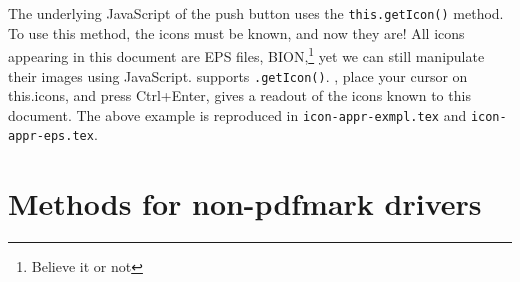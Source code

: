 \documentclass{article}
\begin{document}
\begin{center} %
{}\vcgBdry[6bp]
\olBdry
{}
\end{center}

\noindent
The underlying JavaScript of the push button uses the \texttt{this.getIcon()} method.
To use this method, the icons must be known, and now they are! All icons appearing in this document
are EPS files, BION,\footnote{Believe it or not} yet we can still manipulate their images using JavaScript.
 supports \texttt{.getIcon()}. , place
your cursor on \textsf{this.icons}, and press \textsf{Ctrl+Enter},  gives a readout of
the icons known to this document. The above example is reproduced in \texttt{icon-appr-exmpl.tex} and
\texttt{icon-appr-eps.tex}.

\section{Methods for non-\textsf{pdfmark} drivers}\label{nPdfmark}
\end{document}
